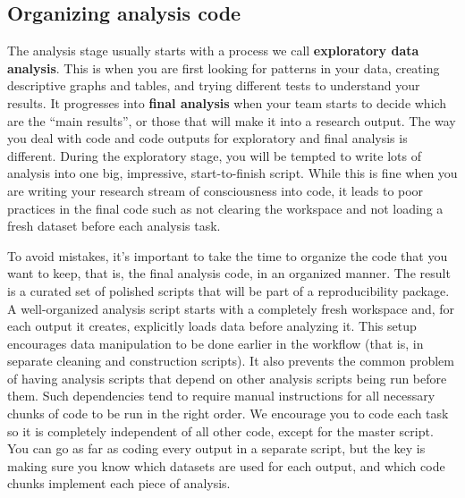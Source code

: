 \subsection{Organizing analysis code}

The analysis stage usually starts with a process we call \textbf{exploratory data analysis}.
This is when you are first looking for patterns in your data,
creating descriptive graphs and tables,
and trying different tests to understand your results.
It progresses into \textbf{final analysis} when your team starts to decide which are the ``main results'', 
or those that will make it into a research output.
The way you deal with code and code outputs for exploratory and final analysis is different.
During the exploratory stage,
you will be tempted to write lots of analysis into one big, impressive, start-to-finish script.
While this is fine when you are writing your research stream of consciousness into code,
it leads to poor practices in the final code such as not clearing the workspace
and not loading a fresh dataset before each analysis task.

To avoid mistakes, it's important to take the time
to organize the code that you want to keep, that is,
the final analysis code, in an organized manner.
The result is a curated set of polished scripts that
will be part of a reproducibility package.
A well-organized analysis script starts with a completely fresh workspace
and, for each output it creates, explicitly loads data before analyzing it.
This setup encourages data manipulation to be done earlier in the workflow
(that is, in separate cleaning and construction scripts).
It also prevents the common problem of having analysis scripts
that depend on other analysis scripts being run before them.
Such dependencies tend to require manual instructions
for all necessary chunks of code to be run in the right order.
We encourage you to code each task so
it is completely independent of all other code,
except for the master script.
You can go as far as coding every output in a separate script,
but the key is making sure you know which datasets are used for each output,
and which code chunks implement each piece of analysis.

